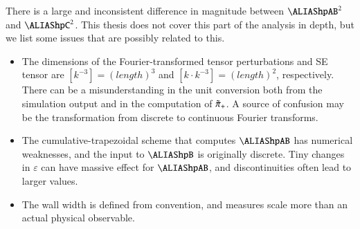     There is a large and inconsistent difference in magnitude between $\hpAB^2$ and $\hpC^2$. This thesis does not cover this part of the analysis in depth, but we list some issues that are possibly related to this.
    \begin{itemize}
        \item The dimensions of the Fourier-transformed tensor perturbations and SE tensor are $[k^{-3}] = \unit{(length)}^{3}$ and $[k \cdot k^{-3}]=\unit{(length)}^{2}$, respectively. There can be a misunderstanding in the unit conversion both from the simulation output and in the computation of $\tilde{\pi}_+$.  A source of confusion may be the transformation from discrete to continuous Fourier transforms. 
        \item The cumulative-trapezoidal scheme that computes $\hpAB$ has numerical weaknesses, and the input to $\hpB$ is originally discrete. Tiny changes in $\varepsilon$ can have massive effect for $\hpAB$, and discontinuities often lead to larger values.
        \item The wall width is defined from convention, and measures scale more than an actual physical observable. 
    \end{itemize}
